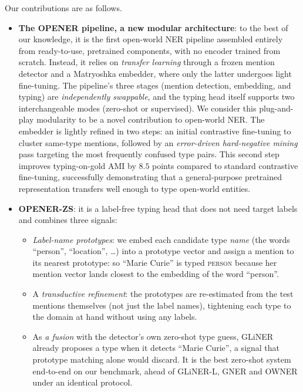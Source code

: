 Our contributions are as follows.
\begin{itemize}
\item \textbf{The OPENER pipeline, a new modular architecture}: to the best of our knowledge, it is the first open-world NER pipeline assembled entirely from ready-to-use, pretrained components, with no encoder trained from scratch. Instead, it relies on \emph{transfer learning} through a frozen mention detector and a Matryoshka embedder, where only the latter undergoes light fine-tuning. The pipeline's three stages (mention detection, embedding, and typing) are \emph{independently swappable}, and the typing head itself supports two interchangeable modes (zero-shot or supervised). We consider this plug-and-play modularity to be a novel contribution to open-world NER.
The embedder is lightly refined in two steps: an initial contrastive fine-tuning to cluster same-type mentions, followed by an \emph{error-driven hard-negative mining} pass targeting the most frequently confused type pairs. This second step improves typing-on-gold AMI by $8.5$ points compared to standard contrastive fine-tuning, successfully demonstrating that a general-purpose pretrained representation transfers well enough to type open-world entities.
\item \textbf{OPENER-ZS}: it is a label-free typing head that does not need target labels and combines three signals:
\begin{itemize}
\item \emph{Label-name prototypes}: we embed each candidate type \emph{name} (the words ``person'', ``location'', \dots) into a prototype vector and assign a mention to its nearest prototype: so ``Marie Curie'' is typed \textsc{person} because her mention vector lands closest to the embedding of the word ``person''.
\item A \emph{transductive refinement}: the prototypes are re-estimated from the test mentions themselves (not just the label names), tightening each type to the domain at hand without using any labels.
\item As \emph{a fusion} with the detector's own zero-shot type guess, GLiNER already proposes a type when it detects ``Marie Curie'', a signal that prototype matching alone would discard. It is the best zero-shot system end-to-end on our benchmark, ahead of GLiNER-L, GNER and OWNER under an identical protocol.
\end{itemize}

\end{itemize}
